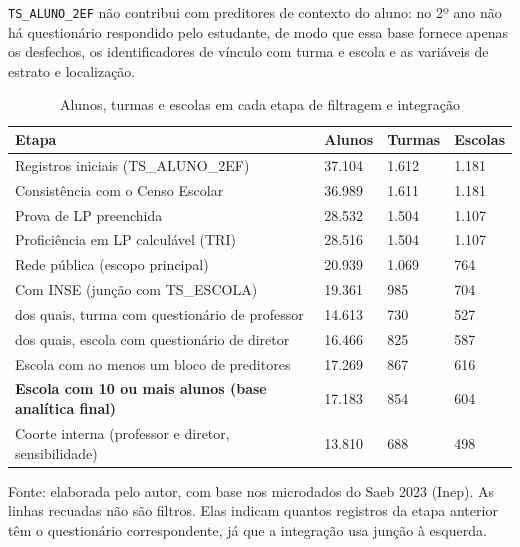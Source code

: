 \texttt{TS\_ALUNO\_2EF} não contribui com preditores de
contexto do aluno: no 2º ano não há questionário
respondido pelo estudante, de modo que essa base fornece apenas os
desfechos, os identificadores de vínculo com turma e escola e as variáveis
de estrato e localização.

\begin{table}[H]
    \centering
    \footnotesize
    \caption{Alunos, turmas e escolas em cada etapa de filtragem e integração}
    \begin{tabular}{L{7.2cm}C{1.9cm}C{1.9cm}C{1.9cm}}
        \toprule
        \textbf{Etapa} & \textbf{Alunos} & \textbf{Turmas} & \textbf{Escolas} \\
        \midrule
        Registros iniciais (TS\_ALUNO\_2EF) & 37.104 & 1.612 & 1.181 \\
        Consistência com o Censo Escolar & 36.989 & 1.611 & 1.181 \\
        Prova de LP preenchida & 28.532 & 1.504 & 1.107 \\
        Proficiência em LP calculável (TRI) & 28.516 & 1.504 & 1.107 \\
        Rede pública (escopo principal) & 20.939 & 1.069 & 764 \\
        Com INSE (junção com TS\_ESCOLA) & 19.361 & 985 & 704 \\
        \quad dos quais, turma com questionário de professor & 14.613 & 730 & 527 \\
        \quad dos quais, escola com questionário de diretor & 16.466 & 825 & 587 \\
        Escola com ao menos um bloco de preditores & 17.269 & 867 & 616 \\
        \textbf{Escola com 10 ou mais alunos (base analítica final)} & 17.183 & 854 & 604 \\
        \midrule
        Coorte interna (professor e diretor, sensibilidade) & 13.810 & 688 & 498 \\
        \bottomrule
    \end{tabular}
    \vspace{0.1cm}
    \begin{flushleft}
    {\footnotesize Fonte: elaborada pelo autor, com base nos microdados do Saeb
    2023 (Inep). As linhas recuadas não são filtros. Elas indicam quantos
    registros da etapa anterior têm o questionário correspondente, já que a
    integração usa junção à esquerda.}
    \end{flushleft}
    \label{tab:cobertura}
\end{table}


